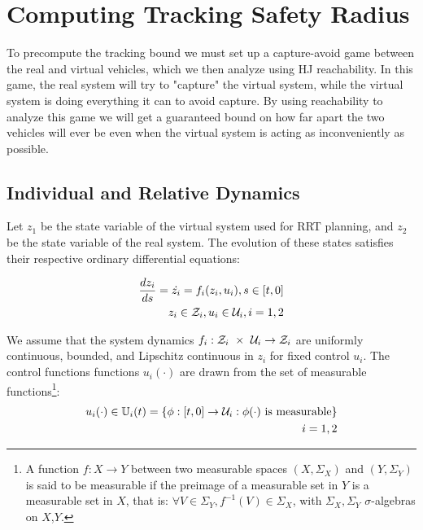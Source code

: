 \section{Computing Tracking Safety Radius \label{sec:reachability}}
To precompute the tracking bound we must set up a capture-avoid game between the real and virtual vehicles, which we then analyze using HJ reachability. In this game, the real system will try to "capture" the virtual system, while the virtual system is doing everything it can to avoid capture. By using reachability to analyze this game we will get a guaranteed bound on how far apart the two vehicles will ever be even when the virtual system is acting as inconveniently as possible.

\subsection{Individual and Relative Dynamics}

Let $z_1$ be the state variable of the virtual system used for RRT planning, and $z_2$ be the state variable of the real system. The evolution of these states satisfies their respective ordinary differential equations:

\begin{equation}
\begin{aligned}
\label{eq:fdyn}
\frac{dz_i}{ds} = \dot{z_i} = f_i(z_i, u_i), s \in [t, 0] \\
z_i \in \mathcal{Z}_i, u_i \in \mathcal{U}_i, i = 1,2
\end{aligned}
\end{equation}

We assume that the system dynamics $f_i : \mathcal{Z}_i\ \times\ \mathcal{U}_i \rightarrow \mathcal{Z}_i$ are uniformly continuous, bounded, and Lipschitz continuous in $z_i$ for fixed control $u_i$. The control functions functions $u_i(\cdot)$ are drawn from the set of measurable functions\footnote{A function $f:X\to Y$ between two measurable spaces $(X,\Sigma_X)$ and $(Y,\Sigma_Y)$ is said to be measurable if the preimage of a measurable set in $Y$ is a measurable set in $X$, that is: $\forall V\in\Sigma_Y, f^{-1}(V)\in\Sigma_X$, with $\Sigma_X,\Sigma_Y$ $\sigma$-algebras on $X$,$Y$.}:
\begin{equation}
\begin{aligned}
u_i(\cdot) \in \mathbb{U}_i(t) = \{\phi: [t, 0] \rightarrow \mathcal{U}_i: \phi(\cdot) \text{ is measurable}\}\\
i = 1,2
\end{aligned}
\end{equation}

